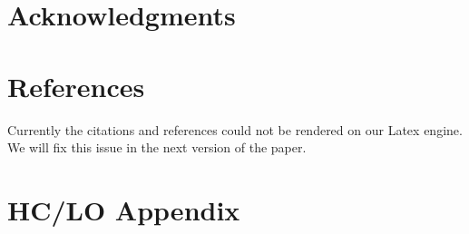 \documentclass{article}
\begin{document}
\section*{Acknowledgments}
\section*{References}
%
%
Currently the citations and references could not be rendered on our Latex engine. We will fix this issue in the next version of the paper.

\clearpage

\appendix


\section{HC/LO Appendix}
\label{sec:hclo}
\end{document}

